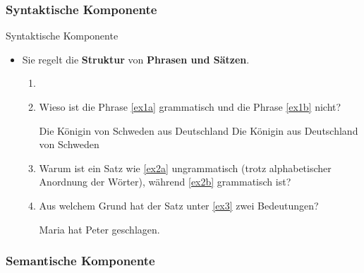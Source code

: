 %
\subsubsection{Syntaktische Komponente}
%
		
\begin{frame}{Syntaktische Komponente}

\begin{itemize}
	\item Sie regelt die \textbf{Struktur} von \textbf{Phrasen und Sätzen}.

	\begin{enumerate}
		\item[]
		\item<2->[$\rightarrow$] Wieso ist die Phrase \ref{ex1a} grammatisch und die Phrase \ref{ex1b} nicht?
		
\eal
	\ex \label{ex1a} Die Königin von Schweden aus Deutschland 
	\ex \label{ex1b} Die Königin aus Deutschland von Schweden
	\zl
		\item<3->[$\rightarrow$] Warum ist ein Satz wie \ref{ex2a} ungrammatisch (trotz alphabetischer Anordnung der Wörter), während \ref{ex2b} grammatisch ist?

\eal
	\label{ex2a}
	\label{ex2b}
	\zl
	
		\item<4->[$\rightarrow$] Aus welchem Grund hat der Satz unter \ref{ex3} zwei Bedeutungen? 

\ea Maria hat Peter geschlagen.\label{ex3}
\z

	\end{enumerate}
			
\end{itemize}

\end{frame}


%
\subsubsection{Semantische Komponente}
%
		
